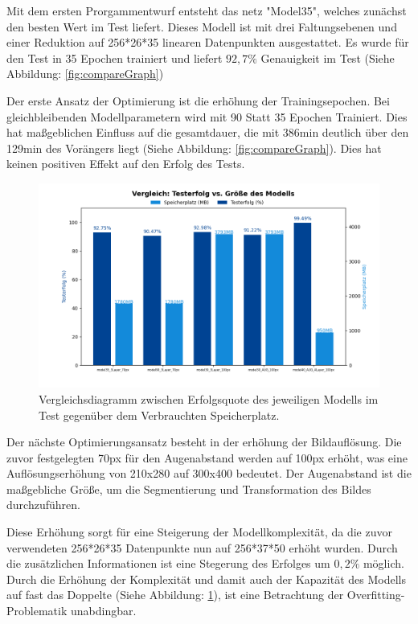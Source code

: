\documentclass[journal,twoside,web]{ieeecolor}
\begin{document}
Mit dem ersten Prorgammentwurf entsteht das netz "Model35", welches zunächst den besten Wert im Test liefert. Dieses Modell ist mit drei Faltungsebenen und einer Reduktion auf 256*26*35 linearen Datenpunkten ausgestattet.
Es wurde für den Test in 35 Epochen trainiert und liefert $92,7\%$ Genauigkeit im Test (Siehe Abbildung: \ref{fig:compareGraph})

Der erste Ansatz der Optimierung ist die erhöhung der Trainingsepochen. Bei gleichbleibenden Modellparametern wird mit 90 Statt 35 Epochen Trainiert.
Dies hat maßgeblichen Einfluss auf die gesamtdauer, die mit 386min deutlich über den 129min des Vorängers liegt (Siehe Abbildung: \ref{fig:compareGraph}). Dies hat keinen positiven Effekt auf den Erfolg des Tests.

\begin{figure}[H]
    \centerline{\includegraphics[width=\columnwidth]{Erfolg_Groesse.png}}
    \caption{Vergleichsdiagramm zwischen Erfolgsquote des jeweiligen Modells im Test gegenüber dem Verbrauchten Speicherplatz.}
    \label{fig:compareSize}
\end{figure}

Der nächste Optimierungsansatz besteht in der erhöhung der Bildauflösung. Die zuvor festgelegten 70px für den Augenabstand werden auf 100px erhöht, was eine Auflösungserhöhung von 210x280 auf 300x400 bedeutet.
Der Augenabstand ist die maßgebliche Größe, um die Segmentierung und Transformation des Bildes durchzuführen.

Diese Erhöhung sorgt für eine Steigerung der Modellkomplexität, da die zuvor verwendeten 256*26*35 Datenpunkte nun auf 256*37*50 erhöht wurden. 
Durch die zusätzlichen Informationen ist eine Stegerung des Erfolges um $0,2\%$ möglich. Durch die Erhöhung der Komplexität und damit auch der Kapazität des Modells auf fast das Doppelte (Siehe Abbildung: \ref{fig:compareSize}), ist eine Betrachtung der Overfitting-Problematik unabdingbar.
\end{document}
